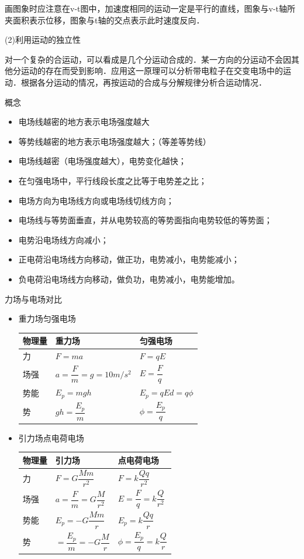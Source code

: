\documentclass[cn,10.5pt,chinese,mac,chinesefont=founder]{elegantbook}
\begin{document}
画图象时应注意在v-t图中，加速度相同的运动一定是平行的直线，图象与v-t轴所夹面积表示位移，图象与t轴的交点表示此时速度反向．

(2)利用运动的独立性

对一个复杂的合运动，可以看成是几个分运动合成的．某一方向的分运动不会因其他分运动的存在而受到影响．应用这一原理可以分析带电粒子在交变电场中的运动．根据各分运动的情况，再按运动的合成与分解规律分析合运动情况．
\newpage
\begin{problemset}

\item 概念
	\begin{itemize}
		\item 电场线越密的地方表示电场强度越大
		\item 等势线越密的地方表示电场强度越大；（等差等势线）
		\item 电场线越密（电场强度越大），电势变化越快；
		\item 在匀强电场中，平行线段长度之比等于电势差之比；
		\item 电场方向为电场线方向或电场线切线方向；
		\item 电场线与等势面垂直，并从电势较高的等势面指向电势较低的等势面；
		\item 电势沿电场线方向减小；
		\item 正电荷沿电场线方向移动，做正功，电势减小，电势能减小；
		\item 负电荷沿电场线方向移动，做负功，电势减小，电势能增加。
	\end{itemize}
\item 力场与电场对比
	\begin{itemize}
		\item 重力场\quad 匀强电场
		\begin{longtable}[]{@{}m{2cm}m{4cm}m{3cm}@{}}
		\toprule
		物理量 & 重力场 & 匀强电场\tabularnewline
		\midrule
		\endhead
		力 & $F=ma$ &$F=qE$\tabularnewline
		场强 &$a=\dfrac{F}{m}=g=10m/s^2$ &$E=\dfrac{F}{q}$\tabularnewline
		
		势能&$E_p=mgh$&$E_p=qEd=q\phi$\tabularnewline
		
		势& $gh=\dfrac{E_p}{m}$& $\phi=\dfrac{E_p}{q}$\tabularnewline
		\bottomrule
		\end{longtable}

		\item 引力场\quad 点电荷电场
		\begin{longtable}[]{@{}m{2cm}m{4cm}m{3cm}@{}}
		\toprule
		物理量 & 引力场 & 点电荷电场\tabularnewline
		\midrule
		\endhead
		力 & $F=G\dfrac{Mm}{r^2}$ &$F=k\dfrac{Qq}{r^2}$\tabularnewline
		场强 &$a=\dfrac{F}{m}=G\dfrac{M}{r^2}$ &$E=\dfrac{F}{q}=k\dfrac{Q}{r^2}$\tabularnewline
		
		势能&$E_p=-G\dfrac{Mm}{r}$&$E_p=k\dfrac{Qq}{r}$\tabularnewline
		
		势& $=\dfrac{E_p}{m}=-G\dfrac{M}{r}$& $\phi=\dfrac{E_p}{q}=k\dfrac{Q}{r}$\tabularnewline
		\bottomrule
		\end{longtable}
	\end{itemize}
\end{problemset}
\end{document}
